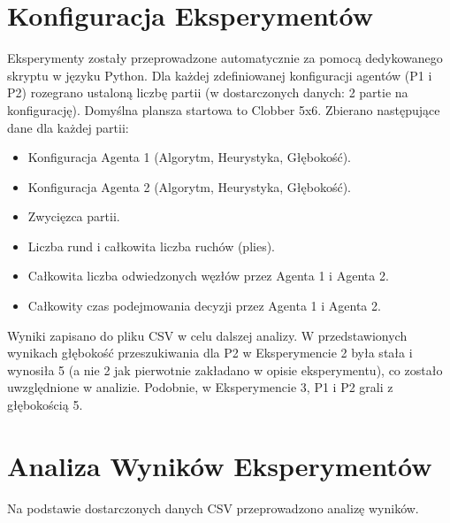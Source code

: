 \documentclass[12pt,a4paper]{article}
\begin{document}
\section{Konfiguracja Eksperymentów}
Eksperymenty zostały przeprowadzone automatycznie za pomocą dedykowanego skryptu w języku Python. Dla każdej zdefiniowanej konfiguracji agentów (P1 i P2) rozegrano ustaloną liczbę partii (w dostarczonych danych: 2 partie na konfigurację). Domyślna plansza startowa to Clobber 5x6.
Zbierano następujące dane dla każdej partii:
\begin{itemize}
    \item Konfiguracja Agenta 1 (Algorytm, Heurystyka, Głębokość).
    \item Konfiguracja Agenta 2 (Algorytm, Heurystyka, Głębokość).
    \item Zwycięzca partii.
    \item Liczba rund i całkowita liczba ruchów (plies).
    \item Całkowita liczba odwiedzonych węzłów przez Agenta 1 i Agenta 2.
    \item Całkowity czas podejmowania decyzji przez Agenta 1 i Agenta 2.
\end{itemize}
Wyniki zapisano do pliku CSV w celu dalszej analizy. W przedstawionych wynikach głębokość przeszukiwania dla P2 w Eksperymencie 2 była stała i wynosiła 5 (a nie 2 jak pierwotnie zakładano w opisie eksperymentu), co zostało uwzględnione w analizie. Podobnie, w Eksperymencie 3, P1 i P2 grali z głębokością 5.

\section{Analiza Wyników Eksperymentów}
Na podstawie dostarczonych danych CSV przeprowadzono analizę wyników.
\end{document}

